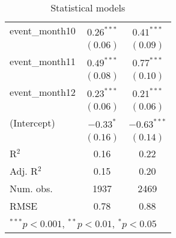 \begin{table}
\begin{center}
\begin{tabular}{l c c }
event\_month10     & $0.26^{***}$ & $0.41^{***}$  \\
                   & $(0.06)$     & $(0.09)$      \\
event\_month11     & $0.49^{***}$ & $0.77^{***}$  \\
                   & $(0.08)$     & $(0.10)$      \\
event\_month12     & $0.23^{***}$ & $0.21^{***}$  \\
                   & $(0.06)$     & $(0.06)$      \\
(Intercept)        & $-0.33^{*}$  & $-0.63^{***}$ \\
                   & $(0.16)$     & $(0.14)$      \\
\hline
R$^2$              & 0.16         & 0.22          \\
Adj. R$^2$         & 0.15         & 0.20          \\
Num. obs.          & 1937         & 2469          \\
RMSE               & 0.78         & 0.88          \\
\hline
\multicolumn{3}{l}{\scriptsize{$^{***}p<0.001$, $^{**}p<0.01$, $^*p<0.05$}}
\end{tabular}
\caption{Statistical models}
\label{table:coefficients}
\end{center}
\end{table}
